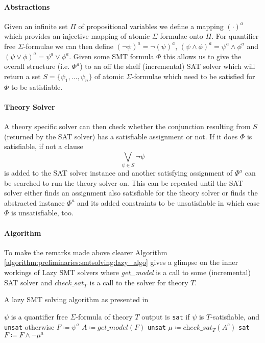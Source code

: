 \paragraph{Abstractions}
Given an infinite set $\Pi$ of propositional variables we define a mapping $(\cdot)^a$ which provides an injective mapping of atomic $\Sigma$-formulae onto $\Pi$. For quantifier-free $\Sigma$-formulae we can then define $\left(\neg\psi\right)^a=\neg\left(\psi\right)^a$, $\left(\psi\land\phi\right)^a=\psi^a\land\phi^a$ and $\left(\psi\lor\phi\right)^a=\psi^a\lor\phi^a$. Given some SMT formula $\Phi$ this allows us to give the overall structure (i.e. $\Phi^a$) to an off the shelf (incremental) SAT solver which will return a set $S=\{\psi_1,\dots,\psi_n\}$ of atomic $\Sigma$-formulae which need to be satisfied for $\Phi$ to be satisfiable.

\paragraph{Theory Solver}
A theory specific solver can then check whether the conjunction resulting from $S$ (returned by the SAT solver) has a satisfiable assignment or not. If it does $\Phi$ is satisfiable, if not a clause \[\bigvee\limits_{\psi\in S} \neg\psi\] is added to the SAT solver instance and another satisfying assignment of $\Phi^a$ can be searched to run the theory solver on. This can be repeated until the SAT solver either finds an assignment also satisfiable for the theory solver or finds the abstracted instance $\Phi^a$ and its added constraints to be unsatisfiable in which case $\Phi$ is unsatisfiable, too.

\paragraph{Algorithm}
To make the remarks made above clearer Algorithm \ref{algorithm:preliminaries:smtsolving:lazy_algo} gives a glimpse on the inner workings of Lazy SMT solvers where \textit{get\_model} is a call to some (incremental) SAT solver and $\textit{check\_sat}_T$ is a call to the solver for theory $T$.

\begin{algorithm}
    \caption{A lazy SMT solving algorithm as presented in \cite{Barrett-Tinelli-SMT}}
    \begin{algorithmic}
    \label{algorithm:preliminaries:smtsolving:lazy_algo}
    \REQUIRE $\psi$ is a quantifier free $\Sigma$-formula of theory $T$
    \ENSURE output is \texttt{sat} if $\psi$ is $T$-satisfiable, and \texttt{unsat} otherwise
    \STATE $F \coloneqq \psi^a$
    \LOOP
        \STATE $A \coloneqq \textit{get\_model}\left(F\right)$
            \RETURN \texttt{unsat}
        \ELSE
            \STATE $\mu \coloneqq \textit{check\_sat}_T\left(A^c\right)$
                \RETURN \texttt{sat}
            \ELSE
                \STATE $F \coloneqq F \land \neg \mu^a$
            \ENDIF
        \ENDIF
    \ENDLOOP
    \end{algorithmic}
\end{algorithm}